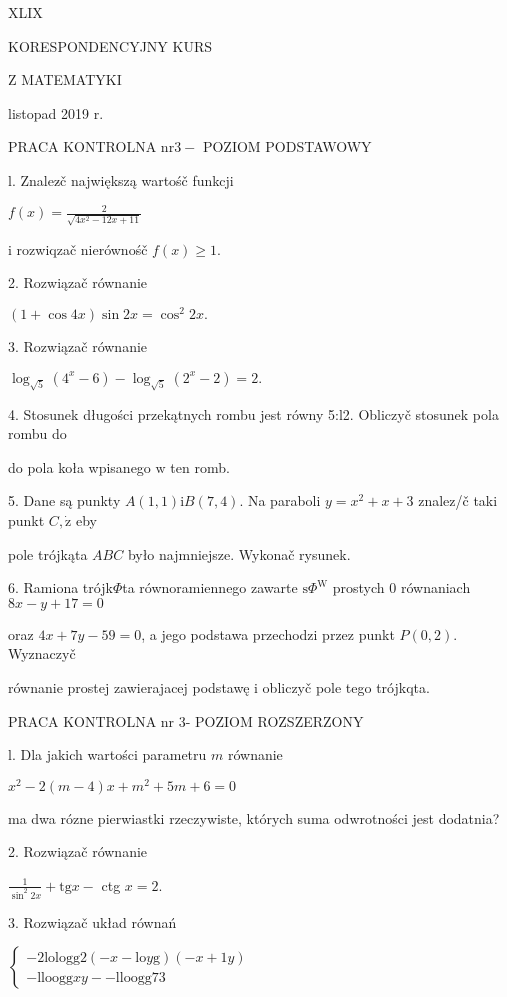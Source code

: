 \documentclass[a4paper,12pt]{article}
\begin{document}
XLIX

KORESPONDENCYJNY KURS

Z MATEMATYKI

listopad 2019 r.

PRACA KONTROLNA $\mathrm{n}\mathrm{r} 3-$ POZIOM PODSTAWOWY

l. Znalez$\acute{}$č największą wartośč funkcji

$f(x)=\displaystyle \frac{2}{\sqrt{4x^{2}-12x+11}}$

$\mathrm{i}$ rozwiqzač nierównośč $f(x)\geq 1.$

2. Rozwiązač równanie

$(1+\cos 4x)\sin 2x=\cos^{2}2x.$

3. Rozwiązač równanie

$\log_{\sqrt{5}}(4^{x}-6)-\log_{\sqrt{5}}(2^{x}-2)=2.$

4. Stosunek długości przekątnych rombu jest równy 5:l2. Obliczyč stosunek pola rombu do

do pola koła wpisanego $\mathrm{w}$ ten romb.

5. Dane są punkty $A(1,1)\mathrm{i}B(7,4)$. Na paraboli $y=x^{2}+x+3$ znalez/č taki punkt $C, \dot{\mathrm{z}}$ eby

pole trójkąta $ABC$ było najmniejsze. Wykonač rysunek.

6. Ramiona trójk$\Phi$ta równoramiennego zawarte $\mathrm{s}\Phi^{\mathrm{W}}$ prostych $0$ równaniach $8x-y+17=0$

oraz $4x+7y-59 = 0$, a jego podstawa przechodzi przez punkt $P(0,2)$. Wyznaczyč

równanie prostej zawierajacej podstawę $\mathrm{i}$ obliczyč pole tego trójkqta.




PRACA KONTROLNA nr 3- POZIOM ROZSZERZONY

l. Dla jakich wartości parametru $m$ równanie

$x^{2}-2(m-4)x+m^{2}+5m+6=0$

ma dwa rózne pierwiastki rzeczywiste, których suma odwrotności jest dodatnia?

2. Rozwiązač równanie

$\displaystyle \frac{1}{\sin^{2}2x}+\mathrm{t}\mathrm{g}x-$ ctg $x=2.$

3. Rozwiązač układ równań

$\left\{\begin{array}{l}
- 2\mathrm{l}\mathrm{o}\mathrm{l}\mathrm{o}\mathrm{g}\mathrm{g}2(- x- \mathrm{l}\mathrm{o}y\mathrm{g})(- x+1y)\\
- \mathrm{l}\mathrm{l}\mathrm{o}\mathrm{o}\mathrm{g}\mathrm{g}xy-- \mathrm{l}\mathrm{l}\mathrm{o}\mathrm{o}\mathrm{g}\mathrm{g}73
\end{array}\right.$
\end{document}
